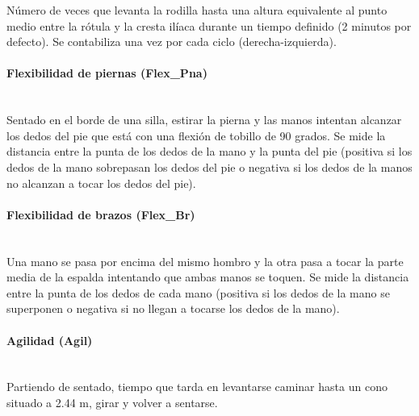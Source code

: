 Número de veces que levanta la rodilla hasta una altura equivalente al punto medio entre la rótula y la cresta ilíaca durante un tiempo definido (2 minutos por defecto). Se contabiliza una vez por cada ciclo (derecha-izquierda).

\paragraph{Flexibilidad de piernas (Flex\_Pna)}\mbox{}\\

Sentado en el borde de una silla, estirar la pierna y las manos intentan alcanzar los dedos del pie que está con una flexión de tobillo de 90 grados. Se mide la distancia entre la punta de los dedos de la mano y la punta del pie (positiva si los dedos de la mano sobrepasan los dedos del pie o negativa si los dedos de la manos no alcanzan a tocar los dedos del pie).

\paragraph{Flexibilidad de brazos (Flex\_Br)}\mbox{}\\

Una mano se pasa por encima del mismo hombro y la otra pasa a tocar la parte media de la espalda intentando que ambas manos se toquen. Se mide la distancia entre la punta de los dedos de cada mano (positiva si los dedos de la mano se superponen o negativa si no llegan a tocarse los dedos de la mano).

\paragraph{Agilidad (Agil)}\mbox{}\\

Partiendo de sentado, tiempo que tarda en levantarse caminar hasta un cono situado a 2.44 m, girar y volver a sentarse.